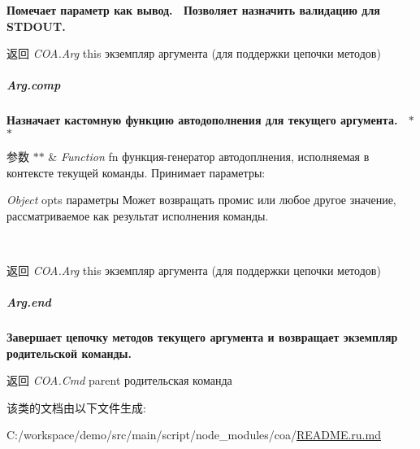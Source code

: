 {\bfseries {\bfseries {\bfseries {\bfseries {\bfseries {\bfseries {\bfseries {\bfseries {\bfseries  Помечает параметр как вывод.~\newline
 Позволяет назначить валидацию для S\+T\+D\+O\+UT.~\newline
 {\bfseries \begin{DoxyReturn}{返回}
{\itshape C\+O\+A.\+Arg} {\ttfamily this} экземпляр аргумента (для поддержки цепочки методов)
\end{DoxyReturn}
\subparagraph*{Arg.\+comp}}}}}}}}}}}

{\bfseries {\bfseries {\bfseries {\bfseries {\bfseries {\bfseries {\bfseries {\bfseries {\bfseries {\bfseries  Назначает кастомную функцию автодополнения для текущего аргумента.~\newline
 $\ast$$\ast$
\begin{DoxyParams}{参数}
{\em $\ast$$\ast$} & {\itshape Function} {\ttfamily fn} функция-\/генератор автодоплнения, исполняемая в контексте текущей команды. Принимает параметры\+:~\newline

\begin{DoxyItemize}
\item {\itshape Object} {\ttfamily opts} параметры Может возвращать промис или любое другое значение, рассматриваемое как результат исполнения команды.~\newline
 {\bfseries }
\end{DoxyItemize}\\
\hline
\end{DoxyParams}
\begin{DoxyReturn}{返回}
{\bfseries } {\itshape C\+O\+A.\+Arg} {\ttfamily this} экземпляр аргумента (для поддержки цепочки методов)
\end{DoxyReturn}
\subparagraph*{Arg.\+end}}}}}}}}}}}

{\bfseries {\bfseries {\bfseries {\bfseries {\bfseries {\bfseries {\bfseries {\bfseries {\bfseries {\bfseries  Завершает цепочку методов текущего аргумента и возвращает экземпляр родительской команды.~\newline
 {\bfseries \begin{DoxyReturn}{返回}
{\itshape C\+O\+A.\+Cmd} {\ttfamily parent} родительская команда 
\end{DoxyReturn}
}}}}}}}}}}}

该类的文档由以下文件生成\+:\begin{DoxyCompactItemize}
\item 
C\+:/workspace/demo/src/main/script/node\+\_\+modules/coa/\mbox{\hyperlink{coa_2_r_e_a_d_m_e_8ru_8md}{R\+E\+A\+D\+M\+E.\+ru.\+md}}\end{DoxyCompactItemize}
